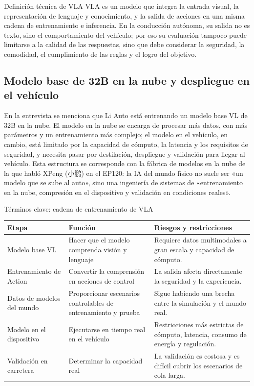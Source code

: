 \begin{importantbox}{Definición técnica de VLA}
VLA es un modelo que integra la entrada visual, la representación de lenguaje y conocimiento, y la salida de acciones en una misma cadena de entrenamiento e inferencia. En la conducción autónoma, su salida no es texto, sino el comportamiento del vehículo; por eso su evaluación tampoco puede limitarse a la calidad de las respuestas, sino que debe considerar la seguridad, la comodidad, el cumplimiento de las reglas y el logro del objetivo.
\end{importantbox}

\subsection{Modelo base de 32B en la nube y despliegue en el vehículo}

En la entrevista se menciona que Li Auto está entrenando un modelo base VL de 32B en la nube. El modelo en la nube se encarga de procesar más datos, con más parámetros y un entrenamiento más complejo; el modelo en el vehículo, en cambio, está limitado por la capacidad de cómputo, la latencia y los requisitos de seguridad, y necesita pasar por destilación, despliegue y validación para llegar al vehículo. Esta estructura se corresponde con la fábrica de modelos en la nube de la que habló XPeng (小鹏) en el EP120: la IA del mundo físico no suele ser «un modelo que se sube al auto», sino una ingeniería de sistemas de «entrenamiento en la nube, compresión en el dispositivo y validación en condiciones reales».

\begin{knowledgebox}{Términos clave: cadena de entrenamiento de VLA}
\begin{tabularx}{\textwidth}{p{}p{}X}
\toprule
Etapa & Función & Riesgos y restricciones \\
\midrule
Modelo base VL & Hacer que el modelo comprenda visión y lenguaje & Requiere datos multimodales a gran escala y capacidad de cómputo. \\
Entrenamiento de Action & Convertir la comprensión en acciones de control & La salida afecta directamente la seguridad y la experiencia. \\
Datos de modelos del mundo & Proporcionar escenarios controlables de entrenamiento y prueba & Sigue habiendo una brecha entre la simulación y el mundo real. \\
Modelo en el dispositivo & Ejecutarse en tiempo real en el vehículo & Restricciones más estrictas de cómputo, latencia, consumo de energía y regulación. \\
Validación en carretera & Determinar la capacidad real & La validación es costosa y es difícil cubrir los escenarios de cola larga. \\
\bottomrule
\end{tabularx}
\end{knowledgebox}

